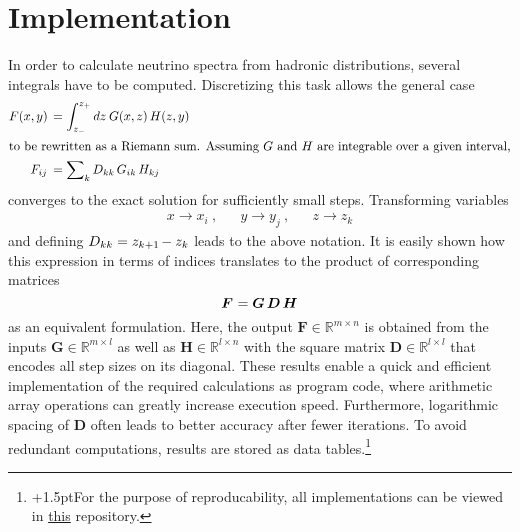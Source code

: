\section{Implementation}
\label{sec:implementation}

In order to calculate neutrino spectra from hadronic distributions, several integrals have to be computed. Discretizing
this task allows the general case
\begin{align*}
	F(x, y) \kern+1.5pt &= \int_{z_{-}}^{z_{+}} dz \: G(x, z) \, H(z, y) \\
	\intertext{to be rewritten as a Riemann sum. Assuming $G$ and $H$ are integrable over a given interval,}
	F_{ij} \kern+1.8pt &= \sum\nolimits_k D_{kk} \, G_{ik} \, H_{kj}
\end{align*}
converges to the exact solution for sufficiently small steps. Transforming variables
\begin{align*}
	&&&& x \rightarrow x_i \: , && y \rightarrow y_j \: , && z \rightarrow z_k &&&&
\end{align*}
and defining $D_{kk} = z_{k+1} \kern-1.0pt - z_k$ leads to the above notation. It is easily shown how this expression in terms of
indices translates to the product of corresponding matrices
\begin{equation*}
	\bm{F} \kern+0.6pt = \bm{G} \, \bm{D} \, \bm{H}
\end{equation*}
as an equivalent formulation. Here, the output $\bm{F} \in \mathbb{R}^{m \times n}$ is obtained from the inputs
$\bm{G} \in \mathbb{R}^{m \times l}$ as well as $\bm{H} \in \mathbb{R}^{l \times n}$ with the square matrix
$\bm{D} \in \mathbb{R}^{l \times l}$ that encodes all step sizes on its diagonal. These results enable a quick and
efficient implementation of the required calculations as program code, where arithmetic array operations can greatly
increase execution speed. Furthermore, logarithmic spacing of $\bm{D}$ often leads to better accuracy after fewer
iterations. To avoid redundant computations, results are stored as data tables.\footnote{
{\kern+1.5pt}For the purpose of reproducability, all implementations can be viewed
in \href{https://github.com/fritzali/bachelor}{this} repository.}
